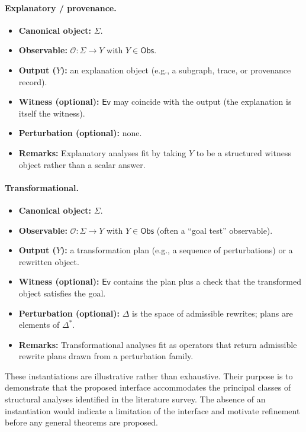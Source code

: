 \documentclass[11pt]{article}
\begin{document}
\paragraph{Explanatory / provenance.}
\begin{itemize}[leftmargin=*]
  \item \textbf{Canonical object:} $\Sigma$.
  \item \textbf{Observable:} $\mathcal O: \Sigma\to Y$ with $Y\in\mathsf{Obs}$.
  \item \textbf{Output ($Y$):} an explanation object (e.g., a subgraph, trace, or provenance record).
  \item \textbf{Witness (optional):} $\mathsf{Ev}$ may coincide with the output (the explanation is itself the witness).
  \item \textbf{Perturbation (optional):} none.
  \item \textbf{Remarks:} Explanatory analyses fit by taking $Y$ to be a structured witness object rather than a scalar answer.
\end{itemize}

\paragraph{Transformational.}
\begin{itemize}[leftmargin=*]
  \item \textbf{Canonical object:} $\Sigma$.
  \item \textbf{Observable:} $\mathcal O: \Sigma\to Y$ with $Y\in\mathsf{Obs}$ (often a ``goal test'' observable).
  \item \textbf{Output ($Y$):} a transformation plan (e.g., a sequence of perturbations) or a rewritten object.
  \item \textbf{Witness (optional):} $\mathsf{Ev}$ contains the plan plus a check that the transformed object satisfies the goal.
  \item \textbf{Perturbation (optional):} $\Delta$ is the space of admissible rewrites; plans are elements of $\Delta^*$.
  \item \textbf{Remarks:} Transformational analyses fit as operators that return admissible rewrite plans drawn from a perturbation family.
\end{itemize}

These instantiations are illustrative rather than exhaustive. Their purpose is to demonstrate that the proposed interface accommodates the principal classes of structural analyses identified in the literature survey. The absence of an instantiation would indicate a limitation of the interface and motivate refinement before any general theorems are proposed.
\end{document}
